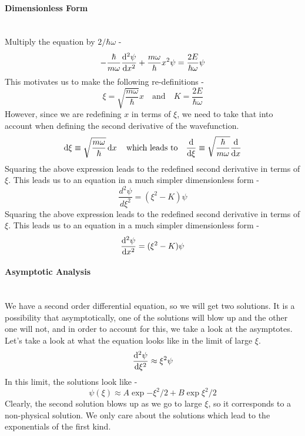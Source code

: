 \paragraph{Dimensionless Form}\,\\
Multiply the equation by $2/\hbar\omega$ -
\begin{equation*}
  -\frac{\hbar}{m\omega}\dv[2]{\psi}{x}+\frac{m\omega}{\hbar}x^2\psi
  =\frac{2E}{\hbar\omega}\psi
\end{equation*}
This motivates us to make the following re-definitions -
\begin{equation*}
  \xi=\sqrt{\frac{m\omega}{\hbar}}x
  \quad\text{and}\quad
  K=\frac{2E}{\hbar\omega}
\end{equation*}
However, since we are redefining $x$ in terms of $\xi$, we need to take that into account when defining the second derivative of the wavefunction.
\begin{equation*}
  \dd{\xi}\equiv\sqrt{\frac{m\omega}{\hbar}}\dd{x} \quad \textrm{which leads to} \quad 
  \dv{\xi}\equiv\sqrt{\frac{\hbar}{m\omega}}\dv{x}
\end{equation*}
Squaring the above expression leads to the redefined second derivative in terms of $\xi$. This leads us to an equation in a much simpler dimensionless form -
\begin{equation*}
  \frac{d^{2}\psi}{d\xi^{2}} = (\xi^{2}-K)\psi
\end{equation*}
Squaring the above expression leads to the redefined second derivative in terms of $\xi$. This leads us to an equation in a much simpler dimensionless form -
\begin{equation*}
  \dv[2]{\psi}{x}=(\xi^2-K)\psi
\end{equation*}
\paragraph{Asymptotic Analysis}\,\\
We have a second order differential equation, so we will get two solutions. It is a possibility that asymptotically, one of the solutions will blow up and the other one will not, and in order to account for this, we take a look at the asymptotes. Let's take a look at what the equation looks like in the limit of large $\xi$.
\begin{equation*}
  \dv[2]{\psi}{\xi}\approx\xi^2\psi
\end{equation*}
In this limit, the solutions look like -
\begin{equation*}
  \psi(\xi)\approx A\exp{-\xi^2/2}+B\exp{\xi^2/2}
\end{equation*}
Clearly, the second solution blows up as we go to large $\xi$, so it corresponds to a non-physical solution. We only care about the solutions which lead to the exponentials of the first kind.
